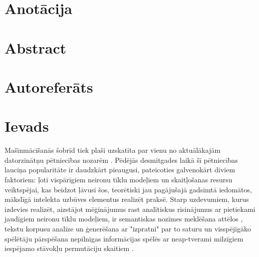 \documentclass[12pt, a4paper]{article}
\numberwithin{equation}{section} %
\begin{document}

\newpage

\section*{Anotācija}
\thispagestyle{empty}

\newpage
{}
\section*{Abstract}
\thispagestyle{empty}


\newpage
{}
\section*{Autoreferāts}
\thispagestyle{empty}
\newpage

\newpage

\tableofcontents
\thispagestyle{empty}
\newpage
\setcounter{page}{7}

\section*{Ievads} %


Mašīnmācīšanās šobrīd tiek plaši uzskatīta par vienu no aktuālākajām datorzinātņu pētniecības nozarēm \cite{no_shit}. Pēdējās desmitgades laikā šī pētniecības lauciņa popularitāte ir daudzkārt pieaugusi, pateicoties galvenokārt diviem faktoriem: ļoti vispārīgiem neironu tīklu modeļiem un skaitļošanas resursu veiktspējai, kas beidzot ļāvusi šos, teorētiski jau pagājušajā gadsimtā \cite{mcculloch1943logical, linnainmaa1970representation, fukushima1988neocognitron} iedomātos, mākslīgā intelekta uzbūves elementus realizēt praksē. Starp uzdevumiem, kurus izdevies realizēt, aizstājot mēģinājumus rast analītiskus risinājumus ar pietiekami jaudīgiem neironu tīklu modeļiem, ir semantiskas nozīmes meklēšana attēlos \cite{krizhevsky2012imagenet}, tekstu korpusu analīze un ģenerēšana ar "izpratni" par to saturu \cite{vaswani2017attention} un visspējīgāko spēlētāju pārspēšana nepilnīgas informācijas spēlēs ar neap-tverami milzīgiem iespējamo stāvokļu permutāciju skaitiem \cite{silver2016mastering}.
\end{document}
